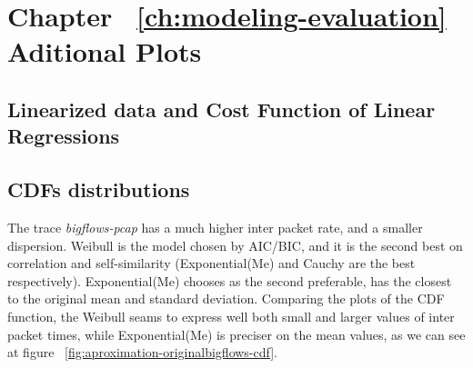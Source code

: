 \chapter{Chapter ~\ref{ch:modeling-evaluation} Aditional Plots}
\label{ap:aditional-plots}

\section{Linearized data and Cost Function of Linear Regressions}

\section{CDFs distributions}

The trace \textit{bigflows-pcap} has a much higher inter packet rate, and a smaller dispersion. Weibull is the model chosen by AIC/BIC, and it is the second best on correlation and self-similarity (Exponential(Me) and Cauchy are the best respectively). Exponential(Me) chooses as the second preferable, has the closest to the original mean and standard deviation. Comparing the plots of the CDF function, the Weibull seams to express well both small and larger values of inter packet times, while Exponential(Me) is preciser on the mean values, as we can see at figure ~\ref{fig:aproximation-originalbigflows-cdf}. 


